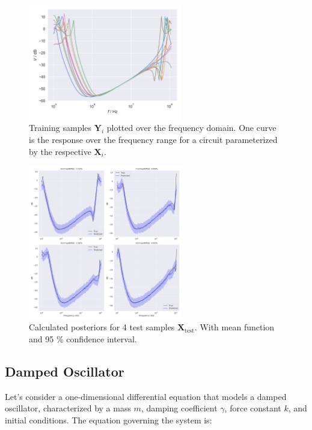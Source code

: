 \documentclass{article}
\begin{document}
\begin{figure}[htbp!]
    \centering
    \includegraphics[width=0.6\textwidth]{plots/transformer/data_samples.png}
    \caption{Training samples $\bm Y_i$ plotted over the frequency domain. One curve is the response over the frequency range for a circuit parameterized by the respective $\bm X_i$.}
    \label{fig:training_samples}
\end{figure}
\begin{figure}[htbp!]
    \centering
    \includegraphics[width=0.6\textwidth]{plots/transformer/prediction_transformer.png}
    \caption{Calculated posteriors for 4 test samples $\bm X_\text{test}$. With mean function and 95 \% confidence interval.}
    \label{fig:training_samples}
\end{figure}
\subsection{Damped Oscillator}
Let's consider a one-dimensional differential equation that models a damped oscillator, characterized by a mass $ m $, damping coefficient $ \gamma $, force constant $k$, and initial conditions. The equation governing the system is:
\end{document}
